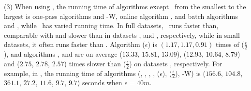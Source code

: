 {\sstab (3) When using \sed, the running time of algorithms except \dagots~from the smallest to the largest is one-pass algorithms \cised and {\cised-W}, online algorithm \squishe, and batch algorithms \tpa and \dpa, while \dagots~has varied running time. In full datasets, \dagots~runs faster than, comparable with and slower than \dpa in datasets \ucar, \geolife and \mopsi, respectively, while in small datasets, it often runs faster than \dpa.
Algorithm \cised(${\epsilon}$) is $(1.17, 1.17, 0.91)$ times of \cised($\frac{\epsilon}{2}$), and algorithms \tpa, \dpa and \squishe are on average
 ($13.33$, $15.81$, $13.09$), ($12.93$, $10.64$, $8.79$) and
($2.75$, $2.78$, $2.57$) times slower than \cised($\frac{\epsilon}{2}$) on datasets \dSets, respectively.
%
For example, in \mopsi, the running time of algorithms
(\tpa, \dpa, {\dagots}, \squishe, \cised($\epsilon$), \cised($\frac{\epsilon}{2}$), {\cised-W}) is ($156.6$, $104.8$, {$361.1$}, $27.2$, $11.6$, $9.7$, {$9.7$}) seconds when $\epsilon$ = $40m$.



}
